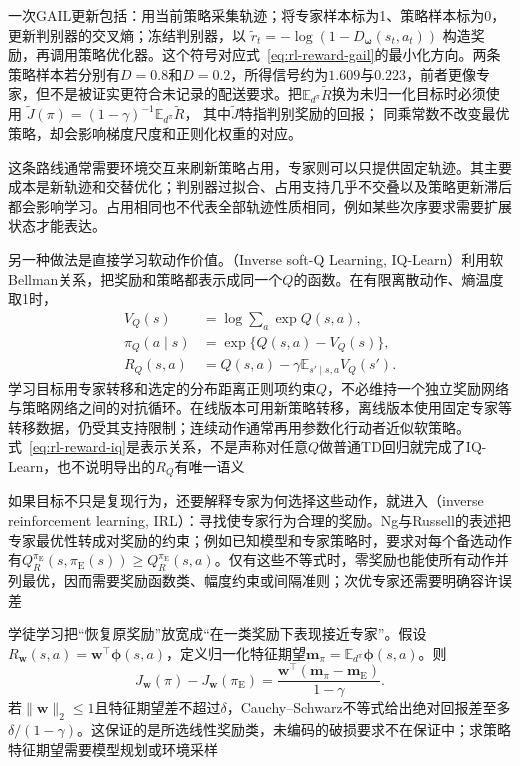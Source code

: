 一次GAIL更新包括：用当前策略采集轨迹；将专家样本标为1、策略样本标为0，更新判别器的交叉熵；冻结判别器，以
$\widetilde r_t=-\log(1-D_{\bm{\omega}}(s_t,a_t))$
构造奖励，再调用策略优化器。这个符号对应式~\eqref{eq:rl-reward-gail}的最小化方向。两条策略样本若分别有$D=0.8$和$D=0.2$，所得信号约为$1.609$与$0.223$，前者更像专家，但不是被证实更符合未记录的配送要求。把$\mathbb E_{d^\pi}\widetilde R$换为未归一化目标时必须使用
$\widetilde J(\pi)=(1-\gamma)^{-1}\mathbb E_{d^\pi}\widetilde R$，
其中$\widetilde J$特指判别奖励的回报；
同乘常数不改变最优策略，却会影响梯度尺度和正则化权重的对应。

这条路线通常需要环境交互来刷新策略占用，专家则可以只提供固定轨迹。其主要成本是新轨迹和交替优化；判别器过拟合、占用支持几乎不交叠以及策略更新滞后都会影响学习。占用相同也不代表全部轨迹性质相同，例如某些次序要求需要扩展状态才能表达。

另一种做法是直接学习软动作价值。（Inverse soft-Q Learning, IQ-Learn）利用软Bellman关系，把奖励和策略都表示成同一个$Q$的函数。在有限离散动作、熵温度取1时，
\begin{equation}
  \begin{aligned}
    V_Q(s)&=\log\sum_a\exp Q(s,a),\\
    \pi_Q(a\mid s)&=\exp\{Q(s,a)-V_Q(s)\},\\
    R_Q(s,a)&=Q(s,a)-\gamma\mathbb E_{s'\mid s,a}V_Q(s').
  \end{aligned}
  \label{eq:rl-reward-iq}
\end{equation}
学习目标用专家转移和选定的分布距离正则项约束$Q$，不必维持一个独立奖励网络与策略网络之间的对抗循环。在线版本可用新策略转移，离线版本使用固定专家等转移数据，仍受其支持限制；连续动作通常再用参数化行动者近似软策略。式~\eqref{eq:rl-reward-iq}是表示关系，不是声称对任意$Q$做普通TD回归就完成了IQ-Learn，也不说明导出的$R_Q$有唯一语义

如果目标不只是复现行为，还要解释专家为何选择这些动作，就进入（inverse reinforcement learning, IRL）：寻找使专家行为合理的奖励。Ng与Russell的表述把专家最优性转成对奖励的约束；例如已知模型和专家策略时，要求对每个备选动作有$Q_R^{\pi_{\mathrm E}}(s,\pi_{\mathrm E}(s))\geq Q_R^{\pi_{\mathrm E}}(s,a)$。仅有这些不等式时，零奖励也能使所有动作并列最优，因而需要奖励函数类、幅度约束或间隔准则；次优专家还需要明确容许误差

学徒学习把“恢复原奖励”放宽成“在一类奖励下表现接近专家”。假设$R_{\bm w}(s,a)=\bm w^\top\bm\phi(s,a)$，定义归一化特征期望$\bm m_\pi=\mathbb E_{d^\pi}\bm\phi(s,a)$。则
\begin{equation}
  J_{\bm w}(\pi)-J_{\bm w}(\pi_{\mathrm E})
  =\frac{\bm w^\top(\bm m_\pi-\bm m_{\mathrm E})}{1-\gamma}.
  \label{eq:rl-reward-feature}
\end{equation}
若$\lVert\bm w\rVert_2\leq1$且特征期望差不超过$\delta$，Cauchy--Schwarz不等式给出绝对回报差至多$\delta/(1-\gamma)$。这保证的是所选线性奖励类，未编码的破损要求不在保证中；求策略特征期望需要模型规划或环境采样

